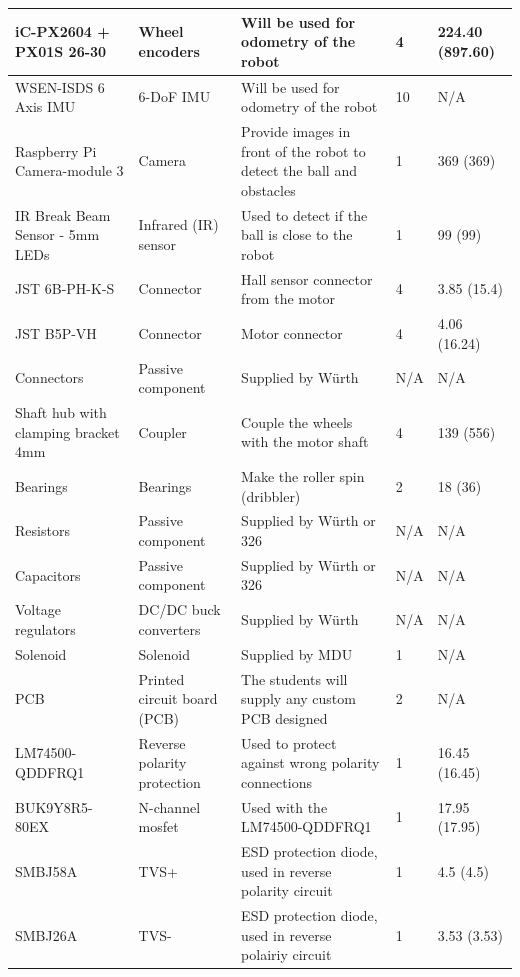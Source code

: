 \documentclass[a4paper,8pt]{article}
\begin{document}
\begin{center}
\begin{longtable}{|p{3cm}|p{3cm}|p{3cm}|p{1cm}|p{3cm}| }
      iC-PX2604 + PX01S 26-30 & Wheel encoders & Will be used for odometry of the robot & 4 & 224.40 (897.60) \\ \hline 
      WSEN-ISDS 6 Axis IMU & 6-DoF IMU & Will be used for odometry of the robot & 10 & N/A\\ \hline 
      Raspberry Pi Camera-module 3 & Camera & Provide images in front of the robot to detect the ball and obstacles & 1 & 369 (369) \\ \hline 
      IR Break Beam Sensor - 5mm LEDs & Infrared (IR) sensor & Used to detect if the ball is close to the robot & 1 & 99 (99) \\ \hline 
      JST 6B-PH-K-S & Connector & Hall sensor connector from the motor & 4 & 3.85 (15.4) \\ \hline 
      JST B5P-VH & Connector & Motor connector & 4 & 4.06 (16.24) \\ \hline 
      Connectors & Passive component & Supplied by Würth & N/A & N/A \\ \hline 
      Shaft hub with clamping bracket 4mm & Coupler & Couple the wheels with the motor shaft & 4 & 139 (556) \\ \hline 
      Bearings & Bearings & Make the roller spin (dribbler) & 2 & 18 (36)\\ \hline 
      Resistors & Passive component & Supplied by Würth or 326 & N/A & N/A \\ \hline 
      Capacitors & Passive component & Supplied by Würth or 326 & N/A & N/A \\ \hline 
      Voltage regulators & DC/DC buck converters & Supplied by Würth & N/A & N/A \\ \hline 
      Solenoid & Solenoid & Supplied by MDU & 1 & N/A \\ \hline 
      PCB & Printed circuit board (PCB) & The students will supply any custom PCB designed & 2 & N/A\\ \hline
      LM74500\break-QDDFRQ1 & Reverse polarity protection & Used to
      protect against wrong polarity connections & 1 & 16.45 (16.45) \\ \hline 
      BUK9Y8R5-80EX & N-channel mosfet & Used with the LM74500\break-QDDFRQ1 & 1 & 17.95 (17.95) \\ \hline 
      SMBJ58A & TVS+ & ESD protection diode, used in reverse polarity circuit & 1 & 4.5 (4.5) \\ \hline 
      SMBJ26A & TVS- & ESD protection diode, used in reverse polairiy circuit & 1 & 3.53 (3.53) \\ \hline
    \end{longtable}
  \end{center}
\end{document}
